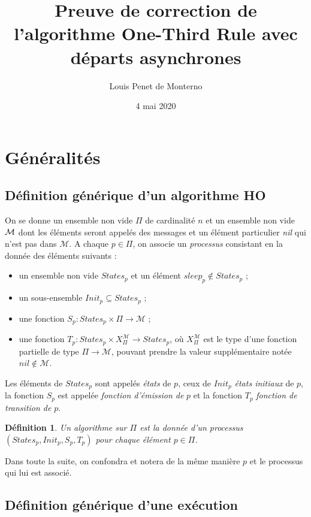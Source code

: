 \documentclass{article}
\title{Preuve de correction de l'algorithme One-Third Rule avec départs asynchrones}
\date{4 mai 2020}
\author{Louis Penet de Monterno}
\newtheorem{definition}{Définition}
\begin{document}
\maketitle
  
\section{Généralités}

\subsection{Définition générique d'un algorithme HO}

On se donne un ensemble non vide $\Pi$ de cardinalit\'e $n$ et  un ensemble non vide ${\cal M}$ dont les \'el\'ements seront appel\'es des
	messages et un \'el\'ement particulier {\em nil} qui n'est pas dans $\mathcal{M}$.
A chaque  $p \in \Pi$,  on associe  un {\em processus} consistant en la donn\'ee des \'el\'ements 
	suivants :
	\begin{itemize}
	\item un ensemble non vide $States_p$ et un  \'el\'ement $sleep_p \notin States_p$ ;
	\item un sous-ensemble   $Init_p \subseteq States_p$ ;
	\item une fonction $S_p : States_p \times \Pi \rightarrow \mathcal{M}$ ;
	\item une fonction 
		$T_p : States_p \times X_\Pi^\mathcal{M}
	  \rightarrow States_p$,
	  où  $X_\Pi^\mathcal{M}$ est le type d'une fonction partielle
			de type $\Pi \rightarrow \mathcal{M}$, pouvant prendre la valeur supplémentaire notée $nil \notin \mathcal{M}$.
	\end{itemize}
Les \'el\'ements de 	$States_p$  sont appel\'es \emph{\'etats} de $p$, ceux de $Init_p$ \emph{\'etats initiaux} de $p$,
	la fonction $S_p$ est appel\'ee \emph{fonction d'émission de} $p$ et la fonction $T_p$ \emph{fonction de transition de} $p$.

\begin{definition}\label{def:algo}
Un algorithme  sur $\Pi$ est la donn\'ee d'un processus $(States_p, Init_p, S_p,T_p)$ pour chaque  \'el\'ement $p \in \Pi$.
\end{definition}
\noindent Dans toute la suite, on confondra et notera de la m\^eme mani\`ere $p$ et le processus qui lui est associ\'e.

\subsection{Définition générique d'une exécution}
\end{document}
